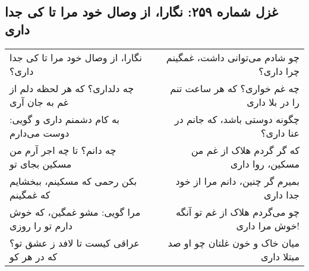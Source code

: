 \begin{center}
\section*{غزل شماره ۲۵۹: نگارا، از وصال خود مرا تا کی جدا داری}
\label{sec:259}
\begin{longtable}{l p{0.5cm} r}
نگارا، از وصال خود مرا تا کی جدا داری؟
&&
چو شادم می‌توانی داشت، غمگینم چرا داری؟
\\
چه دلداری؟ که هر لحظه دلم از غم به جان آری
&&
چه غم خواری؟ که هر ساعت تنم را در بلا داری
\\
به کام دشمنم داری و گویی: دوست می‌دارم
&&
چگونه دوستی باشد، که جانم در عنا داری؟
\\
چه دانم؟ تا چه اجر آرم من مسکین بجای تو
&&
که گر گردم هلاک از غم من مسکین، روا داری
\\
بکن رحمی که مسکینم، ببخشایم که غمگینم
&&
بمیرم گر چنین، دانم مرا از خود جدا داری
\\
مرا گویی: مشو غمگین، که خوش دارم تو را روزی
&&
چو می‌گردم هلاک از غم تو آنگه خوش مرا داری!
\\
عراقی کیست تا لافد ز عشق تو؟ که در هر کو
&&
میان خاک و خون غلتان چو او صد مبتلا داری
\\
\end{longtable}
\end{center}
